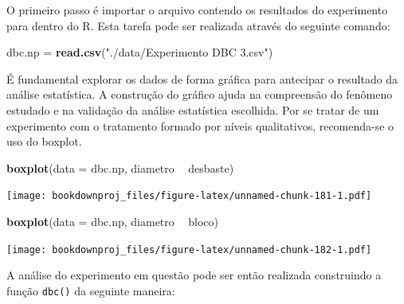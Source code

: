 \documentclass[
]{article}
\newenvironment{Shaded}{\begin{snugshade}}{\end{snugshade}}
\newcommand{\DataTypeTok}[1]{\textcolor[rgb]{0.13,0.29,0.53}{#1}}
\newcommand{\KeywordTok}[1]{\textcolor[rgb]{0.13,0.29,0.53}{\textbf{#1}}}
\newcommand{\NormalTok}[1]{#1}
\newcommand{\OperatorTok}[1]{\textcolor[rgb]{0.81,0.36,0.00}{\textbf{#1}}}
\newcommand{\StringTok}[1]{\textcolor[rgb]{0.31,0.60,0.02}{#1}}
\begin{document}
O primeiro passo é importar o arquivo contendo os resultados do experimento para dentro do R. Esta tarefa pode ser realizada através do seguinte comando:

\begin{Shaded}
\begin{Highlighting}[]
\NormalTok{dbc.np =}\StringTok{ }\KeywordTok{read.csv}\NormalTok{(}\StringTok{"./data/Experimento DBC 3.csv"}\NormalTok{)}
\end{Highlighting}
\end{Shaded}

É fundamental explorar os dados de forma gráfica para antecipar o resultado da análise estatística. A construção do gráfico ajuda na compreensão do fenômeno estudado e na validação da análise estatística escolhida. Por se tratar de um experimento com o tratamento formado por níveis qualitativos, recomenda-se o uso do boxplot.

\begin{Shaded}
\begin{Highlighting}[]
\KeywordTok{boxplot}\NormalTok{(}\DataTypeTok{data =}\NormalTok{ dbc.np, diametro }\OperatorTok{~}\StringTok{ }\NormalTok{desbaste)}
\end{Highlighting}
\end{Shaded}

\texttt{[image: bookdownproj\_files/figure-latex/unnamed-chunk-181-1.pdf]}

\begin{Shaded}
\begin{Highlighting}[]
\KeywordTok{boxplot}\NormalTok{(}\DataTypeTok{data =}\NormalTok{ dbc.np, diametro }\OperatorTok{~}\StringTok{ }\NormalTok{bloco)}
\end{Highlighting}
\end{Shaded}

\texttt{[image: bookdownproj\_files/figure-latex/unnamed-chunk-182-1.pdf]}

A análise do experimento em questão pode ser então realizada construindo a função \texttt{dbc()} da seguinte maneira:

\begin{Shaded}
\end{Shaded}
\end{document}
